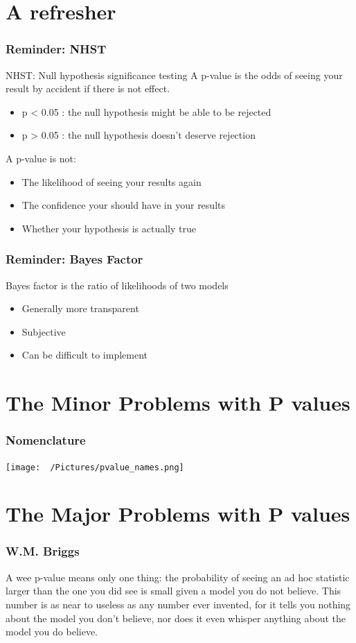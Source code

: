 \documentclass[10pt, compress]{beamer}
\begin{document}
\section{A refresher}
\begin{frame}[fragile]
  \frametitle{Reminder: NHST}
  NHST: Null hypothesis significance testing
  A p-value is the odds of seeing your result by accident if there is not effect.
  \begin{itemize}
  \item p < 0.05 : the null hypothesis might be able to be rejected
  \item p > 0.05 : the null hypothesis doesn't deserve rejection
  \end{itemize}
  A p-value is not:
  \begin{itemize}
  \item The likelihood of seeing your results again
  \item The confidence your should have in your results
  \item Whether your hypothesis is actually true
  \end{itemize}
\end{frame}


\begin{frame}[fragile]
  \frametitle{Reminder: Bayes Factor}
  Bayes factor is the ratio of likelihoods of two models
  \begin{itemize}
  \item Generally more transparent
  \item Subjective
  \item Can be difficult to implement
  \end{itemize}
\end{frame}


\section{The Minor Problems with P values}
\begin{frame}[fragile]
  \frametitle{Nomenclature}
  \texttt{[image: ~/Pictures/pvalue\_names.png]}
\end{frame}

\section{The Major Problems with P values}
\begin{frame}[fragile]
  \frametitle{W.M. Briggs}
  A wee p-value means only one thing: the probability of seeing an ad hoc statistic larger than the one you did see is small given a model you do not believe. This number is as near to useless as any number ever invented, for it tells you nothing about the model you don’t believe, nor does it even whisper anything about the model you do believe.
\end{frame}
\end{document}
